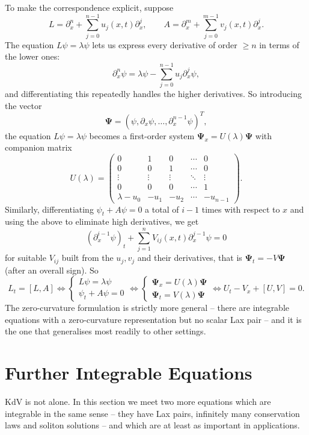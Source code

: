 To make the correspondence explicit, suppose
$$
L = \partial_x^n + \sum_{j=0}^{n-1}u_j(x,t)\partial_x^j, \qquad A = \partial_x^m + \sum_{j=0}^{m-1}v_j(x,t)\partial_x^j.
$$
The equation $L\psi = \lambda\psi$ lets us express every derivative of order $\ge n$ in terms of the lower ones:
$$
\partial_x^n\psi = \lambda\psi - \sum_{j=0}^{n-1}u_j\partial_x^j\psi,
$$
and differentiating this repeatedly handles the higher derivatives. So introducing the vector
$$
\bm\Psi = \left(\psi, \partial_x\psi, \dots, \partial_x^{n-1}\psi\right)^T,
$$
the equation $L\psi = \lambda\psi$ becomes a first-order system $\bm\Psi_x = U(\lambda)\bm\Psi$ with companion matrix
$$
U(\lambda) = \begin{pmatrix}
	0 & 1 & 0 & \cdots & 0\\
	0 & 0 & 1 & \cdots & 0\\
	\vdots & \vdots & \vdots & \ddots & \vdots\\
	0 & 0 & 0 & \cdots & 1\\
	\lambda - u_0 & -u_1 & -u_2 & \cdots & -u_{n-1}
\end{pmatrix}.
$$
Similarly, differentiating $\psi_t + A\psi = 0$ a total of $i-1$ times with respect to $x$ and using the above to eliminate high derivatives, we get
$$
\left(\partial_x^{i-1}\psi\right)_t + \sum_{j=1}^nV_{ij}(x,t)\partial_x^{j-1}\psi = 0
$$
for suitable $V_{ij}$ built from the $u_j, v_j$ and their derivatives, that is $\bm\Psi_t = -V\bm\Psi$ (after an overall sign). So
$$
L_t = [L,A]
\iff
\begin{cases}L\psi = \lambda\psi\\ \psi_t + A\psi = 0\end{cases}
\iff
\begin{cases}\bm\Psi_x = U(\lambda)\bm\Psi\\ \bm\Psi_t = V(\lambda)\bm\Psi\end{cases}
\iff
U_t - V_x + [U,V] = 0.
$$
The zero-curvature formulation is strictly more general -- there are integrable equations with a zero-curvature representation but no scalar Lax pair -- and it is the one that generalises most readily to other settings.

\section{Further Integrable Equations}

KdV is not alone. In this section we meet two more equations which are integrable in the same sense -- they have Lax pairs, infinitely many conservation laws and soliton solutions -- and which are at least as important in applications.

